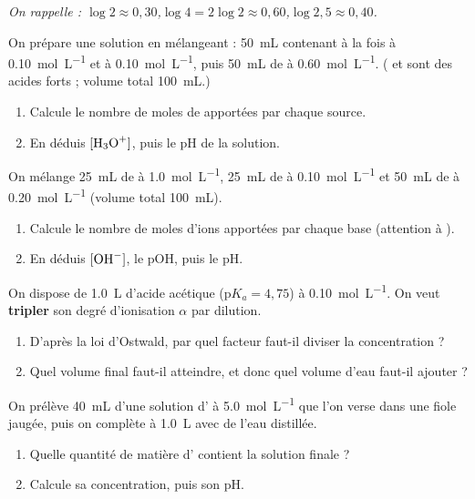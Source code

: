 \documentclass[11pt,a4paper]{article}
\begin{document}
\begin{center}\small\itshape On rappelle : $\log 2 \approx 0{,}30$,\quad $\log 4 = 2\log 2 \approx 0{,}60$,\quad $\log 2{,}5 \approx 0{,}40$.\end{center}

\begin{exo}
On prépare une solution en mélangeant : \qty{50}{mL} contenant à la fois  à \qty{0,10}{mol\per L} et
 à \qty{0,10}{mol\per L}, puis \qty{50}{mL} de  à \qty{0,60}{mol\per L}. ( et 
sont des acides forts ; volume total \qty{100}{mL}.)
\begin{enumerate}[label=\alph*)]
  \item Calcule le nombre de moles de  apportées par chaque source.
  \item En déduis $[\ce{H3O+}]$, puis le pH de la solution.
\end{enumerate}
\end{exo}

\begin{exo}
On mélange \qty{25}{mL} de  à \qty{1,0}{mol\per L}, \qty{25}{mL} de  à
\qty{0,10}{mol\per L} et \qty{50}{mL} de  à \qty{0,20}{mol\per L} (volume total \qty{100}{mL}).
\begin{enumerate}[label=\alph*)]
  \item Calcule le nombre de moles d'ions  apportées par chaque base (attention à ).
  \item En déduis $[\ce{OH-}]$, le pOH, puis le pH.
\end{enumerate}
\end{exo}

\begin{exo}
On dispose de \qty{1,0}{L} d'acide acétique  ($\mathrm{p}K_a = 4{,}75$) à \qty{0,10}{mol\per L}. On
veut \textbf{tripler} son degré d'ionisation $\alpha$ par dilution.
\begin{enumerate}[label=\alph*)]
  \item D'après la loi d'Ostwald, par quel facteur faut-il diviser la concentration ?
  \item Quel volume final faut-il atteindre, et donc quel volume d'eau faut-il ajouter ?
\end{enumerate}
\end{exo}

\begin{exo}
On prélève \qty{40}{mL} d'une solution d' à \qty{5,0}{mol\per L} que l'on verse dans une fiole jaugée,
puis on complète à \qty{1,0}{L} avec de l'eau distillée.
\begin{enumerate}[label=\alph*)]
  \item Quelle quantité de matière d' contient la solution finale ?
  \item Calcule sa concentration, puis son pH.
\end{enumerate}
\end{exo}
\end{document}

